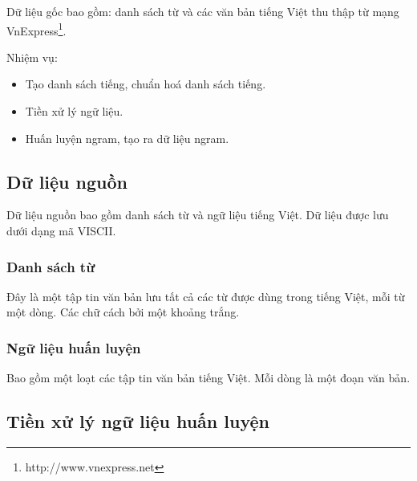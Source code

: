 \documentclass[a4paper,oneside,14pt]{extbook} %
\begin{document}
Dữ liệu gốc bao gồm: danh sách từ và các văn bản tiếng Việt thu thập
từ mạng VnExpress\footnote{http://www.vnexpress.net}.

Nhiệm vụ:
\begin{itemize}
\item Tạo danh sách tiếng, chuẩn hoá danh sách tiếng.
\item Tiền xử lý ngữ liệu.
\item Huấn luyện ngram, tạo ra dữ liệu ngram.
\end{itemize}


\subsection{Dữ liệu nguồn}
\label{sec:data-source}

Dữ liệu nguồn bao gồm danh sách từ và ngữ liệu tiếng Việt. Dữ liệu
được lưu dưới dạng mã VISCII. 
\subsubsection{Danh sách từ}

Đây là một tập tin văn bản lưu tất cả các từ được dùng trong tiếng
Việt, mỗi từ một dòng. Các chữ cách bởi một khoảng trắng.


\subsubsection{Ngữ liệu huấn luyện}

Bao gồm một loạt các tập tin văn bản tiếng Việt. Mỗi dòng là một đoạn
văn bản.






\subsection{Tiền xử lý ngữ liệu huấn luyện}
\label{sec:training-data-preprocessing}
\end{document}
